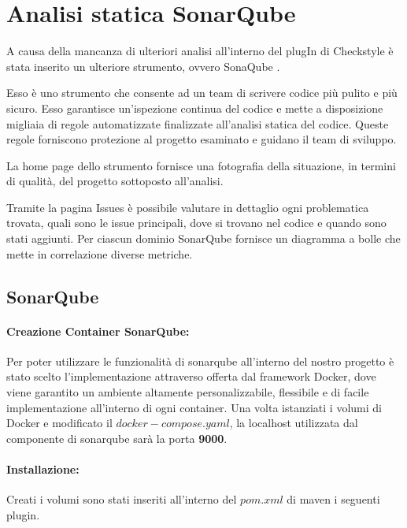\section{Analisi statica SonarQube}
A causa della mancanza di ulteriori analisi all'interno del plugIn di Checkstyle è stata inserito un ulteriore strumento, ovvero SonaQube \cite{SonarQube}.

Esso è uno strumento che consente ad un team di scrivere codice più pulito e più sicuro. Esso garantisce un'ispezione continua del codice e mette a disposizione migliaia di regole automatizzate finalizzate all’analisi statica del codice. Queste regole forniscono protezione al progetto esaminato e guidano il team di sviluppo.

La home page dello strumento fornisce una fotografia della situazione, in termini di qualità, del progetto sottoposto all’analisi.

Tramite la pagina Issues è possibile valutare in dettaglio ogni problematica trovata, quali sono le issue principali, dove si trovano nel codice e quando sono stati aggiunti.
Per ciascun dominio SonarQube fornisce un diagramma a bolle che mette in correlazione diverse metriche.


\subsection{SonarQube}
\paragraph{Creazione Container SonarQube:}
Per poter utilizzare le funzionalità di sonarqube all'interno del nostro progetto è stato scelto l'implementazione attraverso offerta dal framework Docker, dove viene garantito un ambiente altamente personalizzabile, flessibile e di facile implementazione all'interno di ogni container.
Una volta istanziati i volumi di Docker e modificato il $docker-compose.yaml$, la localhost utilizzata dal componente di sonarqube sarà la porta \textbf{9000}.

\paragraph{Installazione:}
Creati i volumi sono stati inseriti all'interno del $pom.xml$ di maven i seguenti plugin.

